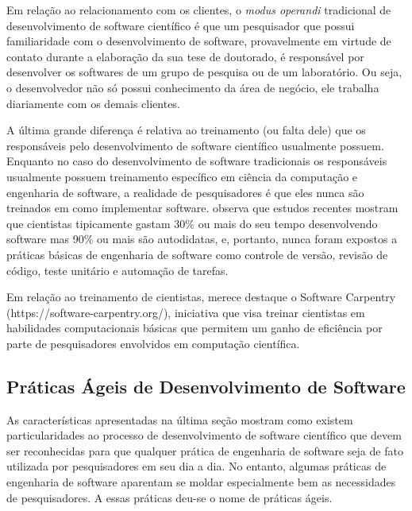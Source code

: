 \documentclass[
	article,			%
	11pt,				%
	oneside,			%
	a4paper,			%
	english,			%
	brazil,				%
	sumario=tradicional
	]{abntex2}
\begin{document}

Em relação ao relacionamento com os clientes, o \emph{modus operandi} tradicional de desenvolvimento de software científico é que um pesquisador que possui familiaridade com o desenvolvimento de software, provavelmente em virtude de contato durante a elaboração da sua tese de doutorado, é responsável por desenvolver os softwares de um grupo de pesquisa ou de um laboratório. Ou seja, o desenvolvedor não só possui conhecimento da área de negócio, ele trabalha diariamente com os demais clientes.

A última grande diferença é relativa ao treinamento (ou falta dele) que os responsáveis pelo desenvolvimento de software científico usualmente possuem. Enquanto no caso do desenvolvimento de software tradicionais os responsáveis usualmente possuem treinamento específico em ciência da computação e engenharia de software, a realidade de pesquisadores é que eles nunca são treinados em como implementar software.  observa que estudos recentes mostram que cientistas tipicamente gastam 30\% ou mais do seu tempo desenvolvendo software mas 90\% ou mais são autodidatas, e, portanto, nunca foram expostos a práticas básicas de engenharia de software como controle de versão, revisão de código, teste unitário e automação de tarefas. 

Em relação ao treinamento de cientistas, merece destaque o Software Carpentry (https://software-carpentry.org/), iniciativa que visa treinar cientistas em habilidades computacionais básicas que permitem um ganho de eficiência por parte de pesquisadores envolvidos em computação científica.

\subsection*{Práticas Ágeis de Desenvolvimento de Software}
As características apresentadas na última seção mostram como existem particularidades ao processo de desenvolvimento de software científico que devem ser reconhecidas para que qualquer prática de engenharia de software seja de fato utilizada por pesquisadores em seu dia a dia. No entanto, algumas práticas de engenharia de software aparentam se moldar especialmente bem as necessidades de pesquisadores. A essas práticas deu-se o nome de práticas ágeis.
\end{document}
